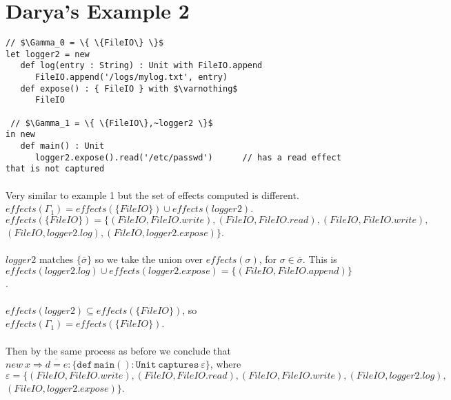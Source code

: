 \documentclass{llncs}
\newcommand{\keywadj}[1]{\mathtt{#1}}
\newcommand{\keyw}[1]{\keywadj{#1}~}
\begin{document}
\section{Darya's Example 2}
\vspace{-6pt}
\begin{lstlisting}[xleftmargin=20pt]
// $\Gamma_0 = \{ \{FileIO\} \}$
let logger2 = new
   def log(entry : String) : Unit with FileIO.append
      FileIO.append('/logs/mylog.txt', entry)
   def expose() : { FileIO } with $\varnothing$
      FileIO
      
 // $\Gamma_1 = \{ \{FileIO\},~logger2 \}$
in new
   def main() : Unit
      logger2.expose().read('/etc/passwd')		// has a read effect that is not captured
\end{lstlisting}

\paragraph{}
Very similar to example 1 but the set of effects computed is different. $effects(\Gamma_1) = effects(\{FileIO\}) \cup effects(logger2)$. $effects(\{FileIO\}) = \{(FileIO, FileIO.write), (FileIO, FileIO.read), (FileIO, FileIO.write),$\\$(FileIO, logger2.log), (FileIO, logger2.expose)\}$.

\paragraph{}
$logger2$ matches $\{ \bar \sigma \}$ so we take the union over $effects(\sigma)$, for $\sigma \in \bar \sigma$. This is $effects(logger2.log) \cup effects(logger2.expose) = \{ (FileIO, FileIO.append) \}$.

\paragraph{}
$effects(logger2) \subseteq effects(\{FileIO\})$, so $effects(\Gamma_1) = effects(\{FileIO\})$.

\paragraph{}
Then by the same process as before we conclude that $new~x \Rightarrow \overline{d = e} : \{ \keywadj{def~main}() : \keyw{Unit~captures} \varepsilon\}$, where $\varepsilon = \{(FileIO, FileIO.write), (FileIO, FileIO.read), (FileIO, FileIO.write), (FileIO, logger2.log),$\\$(FileIO, logger2.expose)\}$.
\end{document}
